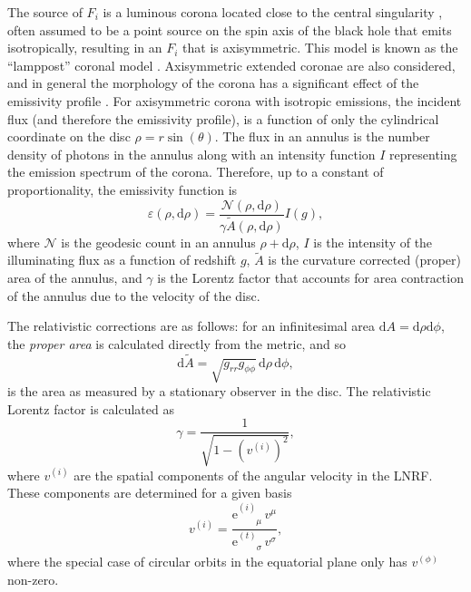 \documentclass[fleqn,usenatbib]{mnras}
\newcommand{\e}{\text{e}}
\renewcommand{\d}{\text{d}}
\newcommand{\utensor}[3]{#1^{#2}_{\phantom{#2}#3}}
\begin{document}
The source of $F_i$ is a luminous corona located close to the central
singularity \citep{svensson_corona_1994}, often assumed to be a point source on the spin axis of
the black hole that emits isotropically, resulting in an $F_i$ that is
axisymmetric. This model is known as the ``lamppost'' coronal model
\citep{fukumura_accretion_2007}. Axisymmetric extended coronae are also
considered, and in general the morphology of the corona has a significant effect
of the emissivity profile \citep{wilkins_towards_2016, gonzalez_probing_2017}.
For axisymmetric corona with isotropic emissions, the incident flux (and
therefore the emissivity profile), is a function of only the cylindrical
coordinate on the disc $\rho = r \sin(\theta)$. The flux in an annulus is the
number density of photons in the annulus along with an intensity function $I$
representing the emission spectrum of the corona.  Therefore, up to a constant
of proportionality, the emissivity function is
\begin{equation}
    \varepsilon (\rho, \d \rho) = \frac{\mathcal{N}(\rho, \d \rho)}{\gamma
    \tilde{A}(\rho, \d \rho)} I(g),
\end{equation}
where $\mathcal{N}$ is the geodesic count in an annulus $\rho + \d \rho$, $I$ is
the intensity of the illuminating flux as a function of redshift $g$,
$\tilde{A}$ is the curvature corrected (proper) area of the annulus, and
$\gamma$ is the Lorentz factor that accounts for area contraction of the annulus
due to the velocity of the disc.

The relativistic corrections are as follows: for an infinitesimal area $\d A = \d
\rho\d\phi$, the \textit{proper area} is calculated directly from the metric,
and so
\begin{equation}
    \d\tilde{A} = \sqrt{g_{rr} g_{\phi\phi}}\, \d \rho\, \d \phi,
\end{equation}
is the area as measured by a stationary observer in the disc. The relativistic
Lorentz factor is calculated as
\begin{equation}
    \gamma = \frac{1}{\sqrt{1 - \left(v^{(i)}\right)^2}},
\end{equation}
where $v^{(i)}$ are the spatial components of the angular velocity in the LNRF.
These components are determined for a given basis
\begin{equation}
    v^{(i)} = \frac{\utensor{\e}{(i)}{\mu}\, v^\mu}{\utensor{\e}{(t)}{\sigma}\, v^\sigma},
\end{equation}
where the special case of circular orbits in the equatorial plane only has
$v^{(\phi)}$ non-zero.
\end{document}
